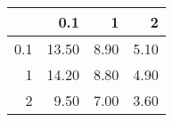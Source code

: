 \begin{tabular}{rrrr}
  \hline
 & 0.1 & 1 & 2 \\ 
  \hline
0.1 & 13.50 & 8.90 & 5.10 \\ 
  1 & 14.20 & 8.80 & 4.90 \\ 
  2 & 9.50 & 7.00 & 3.60 \\ 
   \hline
\end{tabular}
